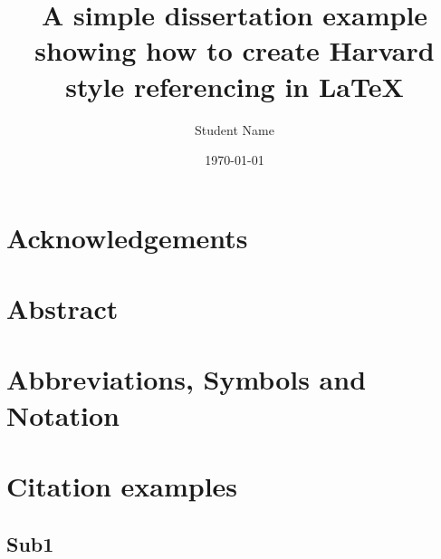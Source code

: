 \documentclass[a4paper, 12pt]{article}
\title{A simple dissertation example showing how to create Harvard style referencing in LaTeX}
\author{Student Name}
\date{\today}
\begin{document}
\maketitle
\pagebreak

\tableofcontents
\pagebreak

{} %
\listoffigures
\pagebreak

{} %
\listoftables
\pagebreak









\section{Acknowledgements}


\pagebreak


\section{Abstract}


\pagebreak


\section{Abbreviations, Symbols and Notation}


\pagebreak


\section{Citation examples}
\subsection{Sub1}
\end{document}
